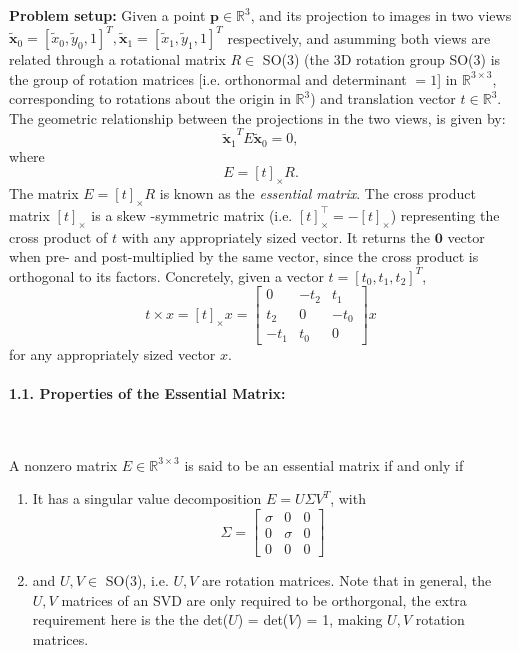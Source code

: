 \newline
\textbf{Problem setup:}
\newline
Given a point $\mathbf{p} \in \mathbb{R}^3$, and its projection to images in two views $\mathbf{\tilde{x}}_{0} = [\tilde{x}_0, \tilde{y}_0, 1]^T,\mathbf{\tilde{x}}_{1} = [\tilde{x}_1, \tilde{y}_1, 1]^T $ respectively, and asumming both views are related through a rotational matrix $R \in$ SO(3) (the 3D rotation group SO(3) is the group of rotation matrices [i.e. orthonormal and determinant $=1$] in $\mathbb{R}^{3\times 3}$, corresponding to rotations about the origin in $\mathbb{R}^3$) and translation vector $t \in \mathbb{R}^3$. The geometric relationship between the projections in the two views, is given by:
\begin{equation}
    {\tilde{\mathbf{x}}_{1}}^T E\tilde{\mathbf{x}}_0  = 0,
\end{equation}
where 
\begin{equation}
    E = [t]_{\times}R.
\end{equation}
\newline
\newline
The matrix $E = [t]_{\times}R$ is known as the \textit{essential matrix}. The cross product matrix $[t]_{\times}$ is a skew -symmetric matrix (i.e. $[t]_{\times}^\top=-[t]_{\times}$) representing the cross product of $t$ with any appropriately sized vector. It returns the $\mathbf{0}$ vector when pre- and post-multiplied by the same vector, since the cross product is orthogonal to its factors. Concretely, given a vector $t = [t_0, t_1, t_2]^T$,
\begin{equation}
t \times x = [t]_{\times}x
=
    \begin{bmatrix}
    0 & -t_{2} & t_{1} \\
    t_{2} & 0 & -t_{0} \\
    -t_{1} & t_{0} & 0
    \end{bmatrix}
    x
\end{equation} 
for any appropriately sized vector $x$.

\paragraph{1.1. Properties of the Essential Matrix:}\ 

A nonzero matrix $E \in \mathbb{R}^{3 \times 3}$ is said to be an essential matrix if and only if 
\begin{enumerate}
\item 
It has a singular value decomposition $E = U \Sigma V^{T}$, with 
\begin{equation*}
\Sigma = 
    \begin{bmatrix}
    \sigma & 0 & 0\\
    0 & \sigma & 0\\
    0 & 0 & 0
    \end{bmatrix}
\end{equation*}
\item
 and $U, V \in$ SO($3$), i.e. $U,V$ are rotation matrices. Note that in general, the $U,V$ matrices of an SVD are only required to be orthorgonal, the extra requirement here is the the det($U$) = det($V$) = 1, making $U,V$ rotation matrices.
 \end{enumerate}
 
